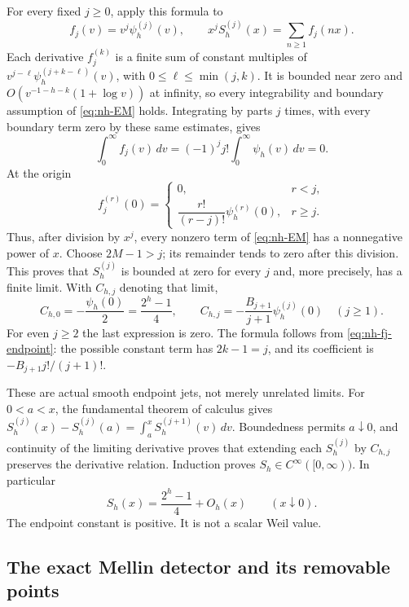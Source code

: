 For every fixed \(j\ge0\), apply this formula to
\[
 f_j(v)=v^j\psi_h^{(j)}(v),\qquad
 x^j S_h^{(j)}(x)=\sum_{n\ge1} f_j(nx).
\]
Each derivative \(f_j^{(k)}\) is a finite sum of constant multiples of
\(v^{j-\ell}\psi_h^{(j+k-\ell)}(v)\), with
\(0\le\ell\le\min(j,k)\). It is bounded near zero and
\(O(v^{-1-h-k}(1+\log v))\) at infinity, so every integrability
and boundary assumption of \eqref{eq:nh-EM} holds.
Integrating by parts \(j\) times, with every boundary term zero by these
same estimates, gives
\[
 \int_0^\infty f_j(v)\,dv
   =(-1)^j j!\int_0^\infty\psi_h(v)\,dv=0.
\]
At the origin
\begin{equation}\label{eq:nh-fj-endpoint}
 f_j^{(r)}(0)=
 \begin{cases}
  0,&r<j,\\[2pt]
  \dfrac{r!}{(r-j)!}\psi_h^{(r)}(0),&r\ge j.
 \end{cases}
\end{equation}
Thus, after division by \(x^j\), every nonzero term of
\eqref{eq:nh-EM} has a nonnegative power of \(x\). Choose
\(2M-1>j\); its remainder tends to zero after this division.
This proves that \(S_h^{(j)}\) is bounded at zero for every \(j\) and,
more precisely, has a finite limit. With
\(C_{h,j}\) denoting that limit,
\begin{equation}\label{eq:nh-S-jets-zero}
 C_{h,0}=-\frac{\psi_h(0)}2=\frac{2^h-1}{4},\qquad
 C_{h,j}=-\frac{B_{j+1}}{j+1}\psi_h^{(j)}(0)\quad(j\ge1).
\end{equation}
For even \(j\ge2\) the last expression is zero. The formula follows
from \eqref{eq:nh-fj-endpoint}: the possible constant term has
\(2k-1=j\), and its coefficient is
\(-B_{j+1}j!/(j+1)!\).

These are actual smooth endpoint jets, not merely unrelated limits.
For \(0<a<x\), the fundamental theorem of calculus gives
\(S_h^{(j)}(x)-S_h^{(j)}(a)=
\int_a^x S_h^{(j+1)}(v)\,dv\). Boundedness permits \(a\downarrow0\),
and continuity of the limiting derivative proves that extending each
\(S_h^{(j)}\) by \(C_{h,j}\) preserves the derivative relation.
Induction proves \(S_h\in C^\infty([0,\infty))\). In particular
\begin{equation}\label{eq:nh-S-zero}
 S_h(x)=\frac{2^h-1}{4}+O_h(x)\qquad(x\downarrow0).
\end{equation}
The endpoint constant is positive. It is not a scalar Weil value.

\subsection{The exact Mellin detector and its removable points}

